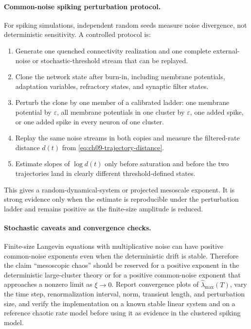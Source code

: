 \paragraph{Common-noise spiking perturbation protocol.}
For spiking simulations, independent random seeds measure noise divergence, not
deterministic sensitivity. A controlled protocol is:
\begin{enumerate}
    \item Generate one quenched connectivity realization and one complete
    external-noise or stochastic-threshold stream that can be replayed.
    \item Clone the network state after burn-in, including membrane potentials,
    adaptation variables, refractory states, and synaptic filter states.
    \item Perturb the clone by one member of a calibrated ladder: one membrane
    potential by \(\varepsilon\), all membrane potentials in one cluster by
    \(\varepsilon\), one added spike, or one added spike in every neuron of one
    cluster.
    \item Replay the same noise streams in both copies and measure the
    filtered-rate distance \(d(t)\) from \eqref{eq:ch09-trajectory-distance}.
    \item Estimate slopes of \(\log d(t)\) only before saturation and before
    the two trajectories land in clearly different threshold-defined states.
\end{enumerate}
This gives a random-dynamical-system or projected mesoscale exponent. It is
strong evidence only when the estimate is reproducible under the perturbation
ladder and remains positive as the finite-size amplitude is reduced.

\paragraph{Stochastic caveats and convergence checks.}
Finite-size Langevin equations with multiplicative noise can have positive
common-noise exponents even when the deterministic drift is stable. Therefore
the claim ``mesoscopic chaos'' should be reserved for a positive exponent in
the deterministic large-cluster theory or for a positive common-noise exponent
that approaches a nonzero limit as \(\xi\to 0\). Report convergence plots of
\(\widehat\lambda_{\max}(T)\), vary the time step, renormalization interval,
norm, transient length, and perturbation size, and verify the implementation on
a known stable linear system and on a reference chaotic rate model before using
it as evidence in the clustered spiking model.

